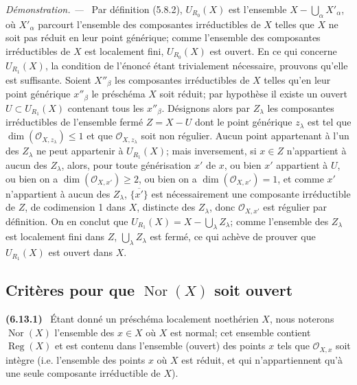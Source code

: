 \documentclass[10pt,oneside]{book}
\newcommand{\oldpage}[2][]{%
  \setcounter{footnote}{0}%
  \marginpar{\scriptsize\textbf{#1}~|~#2}\ignorespaces}
\newenvironment{env}[1][]{\par\medskip\noindent\textbf{(#1)}\ }{\par}
\newenvironment{proof}{%
  \par\medskip\noindent\textit{Démonstration. ---\ }}{\par}
\begin{document}
\begin{proof}
Par définition (5.8.2), $U_{R_0}(X)$ est l'ensemble
$X-\bigcup_\alpha X'_\alpha$, où $X'_\alpha$ parcourt l'ensemble des
composantes irréductibles de $X$ telles que $X$ ne soit pas réduit en leur
point générique; comme l'ensemble des composantes irréductibles de $X$ est
localement fini, $U_{R_0}(X)$ est ouvert. En ce qui concerne $U_{R_1}(X)$,
la condition de l'énoncé étant trivialement nécessaire, prouvons qu'elle est
suffisante. Soient $X''_\beta$ les composantes irréductibles de $X$ telles
qu'en leur point générique $x''_\beta$ le préschéma $X$ soit réduit; par
hypothèse il existe un ouvert $U\subset U_{R_1}(X)$ contenant tous les
$x''_\beta$. Désignons alors par $Z_\lambda$ les composantes irréductibles
de l'ensemble fermé $Z=X-U$ dont le point générique $z_\lambda$ est tel que
$\dim(\mathcal O_{X,z_\lambda})\leq1$ et que
$\mathcal O_{X,z_\lambda}$ soit non régulier. Aucun point appartenant à
l'un des $Z_\lambda$ ne peut appartenir
\oldpage[IV-2]{168}
à $U_{R_1}(X)$; mais inversement, si $x\in Z$ n'appartient à aucun des
$Z_\lambda$, alors, pour toute générisation $x'$ de $x$, ou bien $x'$
appartient à $U$, ou bien on a $\dim(\mathcal O_{X,x'})\geq2$, ou bien on a
$\dim(\mathcal O_{X,x'})=1$, et comme $x'$ n'appartient à aucun des
$Z_\lambda$, $\overline{\{x'\}}$ est nécessairement une composante
irréductible de $Z$, de codimension 1 dans $X$, distincte des $Z_\lambda$,
donc $\mathcal O_{X,x'}$ est régulier par définition. On en conclut que
$U_{R_1}(X)=X-\bigcup_\lambda Z_\lambda$; comme l'ensemble des $Z_\lambda$
est localement fini dans $Z$, $\bigcup_\lambda Z_\lambda$ est fermé, ce qui
achève de prouver que $U_{R_1}(X)$ est ouvert dans $X$.
\end{proof}

\subsection{\texorpdfstring{Critères pour que $\operatorname{Nor}(X)$ soit ouvert}{Critères pour que Nor(X) soit ouvert}}
\label{IV.2.s6.13-fr}

\begin{env}[6.13.1]
\label{IV.2.s6.13.1-fr}
Étant donné un préschéma localement noethérien $X$, nous noterons
$\operatorname{Nor}(X)$ l'ensemble des $x\in X$ où $X$ est normal; cet
ensemble contient $\operatorname{Reg}(X)$ et est contenu dans l'ensemble
(ouvert) des points $x$ tels que $\mathcal O_{X,x}$ soit intègre (i.e.
l'ensemble des points $x$ où $X$ est réduit, et qui n'appartiennent qu'à
une seule composante irréductible de $X$).
\end{env}
\end{document}
